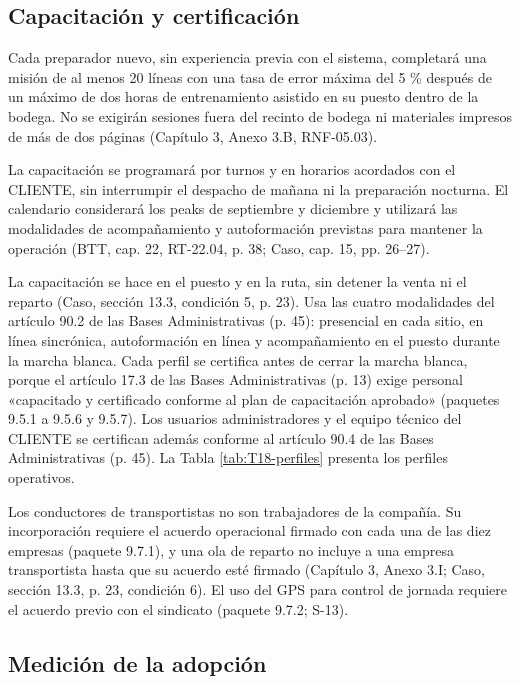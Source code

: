 \subsection{Capacitación y certificación}

Cada preparador nuevo, sin experiencia previa con el sistema, completará una misión de al menos 20 líneas con una tasa de error máxima del 5 \% después de un máximo de dos horas de entrenamiento asistido en su puesto dentro de la bodega. No se exigirán sesiones fuera del recinto de bodega ni materiales impresos de más de dos páginas (Capítulo 3, Anexo 3.B, RNF-05.03).

La capacitación se programará por turnos y en horarios acordados con el CLIENTE, sin interrumpir el despacho de mañana ni la preparación nocturna. El calendario considerará los peaks de septiembre y diciembre y utilizará las modalidades de acompañamiento y autoformación previstas para mantener la operación (BTT, cap. 22, RT-22.04, p. 38; Caso, cap. 15, pp. 26--27).

La capacitación se hace en el puesto y en la ruta, sin detener la venta ni el reparto (Caso, sección 13.3, condición 5, p. 23). Usa las cuatro modalidades del artículo 90.2 de las Bases Administrativas (p. 45): presencial en cada sitio, en línea sincrónica, autoformación en línea y acompañamiento en el puesto durante la marcha blanca. Cada perfil se certifica antes de cerrar la marcha blanca, porque el artículo 17.3 de las Bases Administrativas (p. 13) exige personal «capacitado y certificado conforme al plan de capacitación aprobado» (paquetes 9.5.1 a 9.5.6 y 9.5.7). Los usuarios administradores y el equipo técnico del CLIENTE se certifican además conforme al artículo 90.4 de las Bases Administrativas (p. 45). La Tabla \ref{tab:T18-perfiles} presenta los perfiles operativos.


Los conductores de transportistas no son trabajadores de la compañía. Su incorporación requiere el acuerdo operacional firmado con cada una de las diez empresas (paquete 9.7.1), y una ola de reparto no incluye a una empresa transportista hasta que su acuerdo esté firmado (Capítulo 3, Anexo 3.I; Caso, sección 13.3, p. 23, condición 6). El uso del GPS para control de jornada requiere el acuerdo previo con el sindicato (paquete 9.7.2; S-13).

\subsection{Medición de la adopción}

